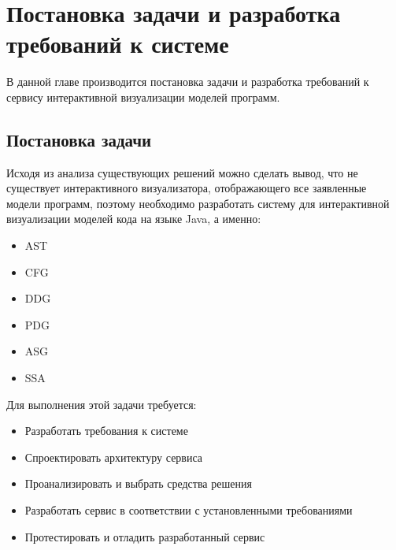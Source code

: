 \chapter{Постановка задачи и разработка требований к системе} \label{ch3}
В данной главе производится постановка задачи и разработка требований к сервису интерактивной визуализации моделей программ.
\section{Постановка задачи} \label{ch3:sec1}
Исходя из анализа существующих решений можно сделать вывод, что не существует интерактивного визуализатора, отображающего все заявленные модели программ, поэтому необходимо разработать систему для интерактивной визуализации моделей кода на языке Java, а именно:
\begin{itemize}
\item AST
\item CFG
\item DDG
\item PDG
\item ASG
\item SSA
\end{itemize}
Для выполнения этой задачи требуется:
\begin{itemize}
\item Разработать требования к системе
\item Спроектировать архитектуру сервиса
\item Проанализировать и выбрать средства решения
\item Разработать сервис в соответствии с установленными требованиями
\item Протестировать и отладить разработанный сервис
\end{itemize}
